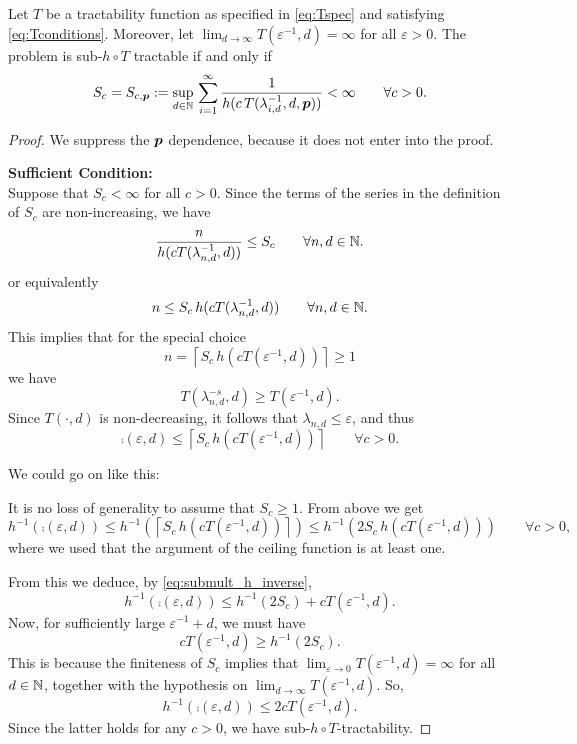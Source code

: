 \documentclass[11pt,a4paper]{article}
\newcommand{\peter}[1]{\begingroup\color{purple}#1\endgroup}
\begin{document}
\begin{theorem}\label{thm:subhT}
	Let $T$ be a tractability function as specified in \eqref{eq:Tspec} and satisfying \eqref{eq:Tconditions}.  Moreover, let $\lim_{d \to \infty} T(\varepsilon^{-1},d) = \infty$ for all $\varepsilon > 0$.  The problem is sub-$h \circ T$ tractable if and only if
	\[
	S_c = S_{c,\boldsymbol{p}} :=\sup_{d\in\mathbb{N}}  \, \sum_{i=1}^\infty \frac1{h(c\, T(\lambda_{i,d}^{-1},d,\boldsymbol{p}))} <\infty \qquad \forall c > 0.
	\]
\end{theorem}
\begin{proof}
We suppress the $\boldsymbol{p}$ dependence, because it does not enter into the proof.

\bigskip

\noindent \textbf{Sufficient Condition:}\\	
Suppose that $S_c <\infty$ for all $c>0$.  Since the terms of the series in the definition of $S_c$ are non-increasing, we have 
	\[
		\frac{n}{h(cT(\lambda_{n,d}^{-1},d))}\le S_c \qquad \forall n,d \in \mathbb{N}.
	\]
or equivalently
\[
	n\le S_c \, h(cT(\lambda_{n,d}^{-1},d))   \qquad \forall n,d \in \mathbb{N}.
\]
This implies that for the special choice 
\[
	n = \left\lceil 
	S_c \, h(cT(\varepsilon^{-1},d))  
	\right\rceil \ge 1
\]
	we have
	\[
	T(\lambda_{n,d}^{-s},d) \ge T(\varepsilon^{-1},d).
	\]
Since $T(\cdot,d)$ is non-decreasing, it follows that $\lambda_{n,d} \le \varepsilon$, and thus 
\[
\comp(\varepsilon,d) \le  \left\lceil 
S_c \, h(cT(\varepsilon^{-1},d))  
\right\rceil \qquad \forall c > 0.  
\]

\peter{
We could go on like this:

It is no loss of generality to assume that $S_c \ge 1$. From above we get 
\[
h^{-1}(\comp(\varepsilon,d)) \le h^{-1} \left( \left\lceil 
S_c \, h(cT(\varepsilon^{-1},d))  
\right\rceil \right) \le h^{-1} \left(  
2 S_c \, h(cT(\varepsilon^{-1},d))  
 \right) \qquad \forall c > 0,
\]
where we used that the argument of the ceiling function is at least one.

From this we deduce, by \eqref{eq:submult_h_inverse},
\[
h^{-1}(\comp(\varepsilon,d)) \le
 h^{-1} (2 S_c) + cT (\varepsilon^{-1},d).
\]
Now, for sufficiently large $\varepsilon^{-1}+d$, we must have
\[
c T (\varepsilon^{-1},d) \ge h^{-1} (2 S_c).
\]
This is because the finiteness of $S_c$ implies that $\lim_{\varepsilon \to 0} T(\varepsilon^{-1},d) = \infty$ for all $d \in \mathbb{N}$,  together with the hypothesis on $\lim_{d \to \infty} T(\varepsilon^{-1},d)$.
So, 
\[
h^{-1}(\comp(\varepsilon,d)) \le 2 cT (\varepsilon^{-1},d).
\]
Since the latter holds for any $c>0$, we have sub-$h\circ T$-tractability.

}
\end{proof}
\end{document}
